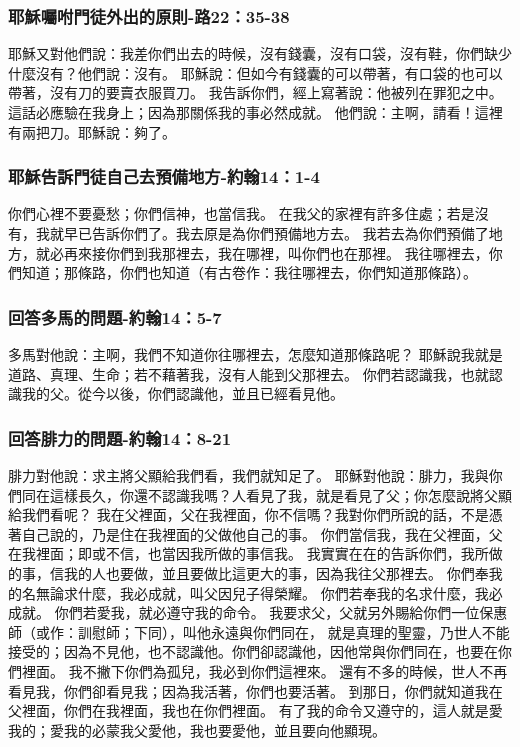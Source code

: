 \subsubsection{耶穌囑咐門徒外出的原則-路22：35-38}

耶穌又對他們說：我差你們出去的時候，沒有錢囊，沒有口袋，沒有鞋，你們缺少什麼沒有？他們說：沒有。
耶穌說：但如今有錢囊的可以帶著，有口袋的也可以帶著，沒有刀的要賣衣服買刀。
我告訴你們，經上寫著說：他被列在罪犯之中。這話必應驗在我身上；因為那關係我的事必然成就。
他們說：主啊，請看！這裡有兩把刀。耶穌說：夠了。

\subsubsection{耶穌告訴門徒自己去預備地方-約翰14：1-4}
你們心裡不要憂愁；你們信神，也當信我。
在我父的家裡有許多住處；若是沒有，我就早已告訴你們了。我去原是為你們預備地方去。
我若去為你們預備了地方，就必再來接你們到我那裡去，我在哪裡，叫你們也在那裡。
我往哪裡去，你們知道；那條路，你們也知道（有古卷作：我往哪裡去，你們知道那條路）。
\subsubsection{回答多馬的問題-約翰14：5-7}
多馬對他說：主啊，我們不知道你往哪裡去，怎麼知道那條路呢？
耶穌說我就是道路、真理、生命；若不藉著我，沒有人能到父那裡去。
你們若認識我，也就認識我的父。從今以後，你們認識他，並且已經看見他。
\subsubsection{回答腓力的問題-約翰14：8-21}
腓力對他說：求主將父顯給我們看，我們就知足了。
耶穌對他說：腓力，我與你們同在這樣長久，你還不認識我嗎？人看見了我，就是看見了父；你怎麼說將父顯給我們看呢？
我在父裡面，父在我裡面，你不信嗎？我對你們所說的話，不是憑著自己說的，乃是住在我裡面的父做他自己的事。
你們當信我，我在父裡面，父在我裡面；即或不信，也當因我所做的事信我。
我實實在在的告訴你們，我所做的事，信我的人也要做，並且要做比這更大的事，因為我往父那裡去。
你們奉我的名無論求什麼，我必成就，叫父因兒子得榮耀。
你們若奉我的名求什麼，我必成就。
你們若愛我，就必遵守我的命令。
我要求父，父就另外賜給你們一位保惠師（或作：訓慰師；下同），叫他永遠與你們同在，
就是真理的聖靈，乃世人不能接受的；因為不見他，也不認識他。你們卻認識他，因他常與你們同在，也要在你們裡面。
我不撇下你們為孤兒，我必到你們這裡來。
還有不多的時候，世人不再看見我，你們卻看見我；因為我活著，你們也要活著。
到那日，你們就知道我在父裡面，你們在我裡面，我也在你們裡面。
有了我的命令又遵守的，這人就是愛我的；愛我的必蒙我父愛他，我也要愛他，並且要向他顯現。
